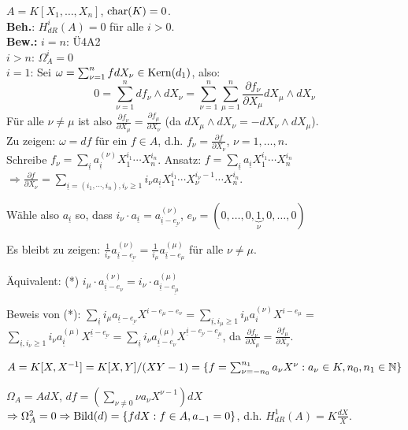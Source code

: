 \documentclass[a4paper, 10pt]{report}
\begin{document}
\begin{nnBsp}
$A=K[X_1, \ldots, X_n]$, $\mathrm{char}(K)=0$.\\
\textbf{Beh.}: $H_{dR}^i(A) = 0$ f\"ur alle $i>0$.\\
\textbf{Bew.: } $i=n$: \"U4A2\\
$i>n$: $\Omega_A^i=0$\\
$i=1$: Sei $\omega=\sum_{\nu=1}^nf dX_\nu\in \mathrm{Kern}(d_1)$, also:
\[
0=\sum_{\nu=1}^n df_\nu \wedge dX_\nu=\sum_{\nu=1}^n \sum_{\mu=1}^n
\frac{\partial f_\nu}{\partial X_\mu}dX_\mu\wedge dX_\nu
\]
F\"ur alle $\nu\neq \mu$ ist also $\frac{\partial f_\nu}{\partial X_\mu}=\frac{\partial f_\mu}{\partial X_\nu}$
(da $dX_\mu\wedge dX_\nu = -dX_\nu\wedge dX_\mu$).\\
Zu zeigen: $\omega = df$ f\"ur ein $f\in A$, d.h. $f_\nu=\frac{\partial f}{\partial X_\nu}$, $\nu=1, \ldots, n$.\\
Schreibe $f_\nu=\sum_{\underline{i}} a_{\underline{i}}^{(\nu)}X_1^{i_1}\cdots X_n^{i_n}$.
Ansatz: $f=\sum_{\underline{i}} a_{\underline{i}} X_1^{i_1}\cdots X_n^{i_n}$
$\Rightarrow \frac{\partial f}{\partial X_\nu}
=\sum_{\underline{i}=(i_1, \cdots, i_n), i_\nu\geq 1}i_\nu a_{\underline{i}}
X_1^{i_1}\cdots X_\nu^{i_\nu-1} \cdots X_n^{i_n}$.

W\"ahle also $a_{\underline{i}}$ so, dass $i_\nu\cdot a_{\underline{i}} = a_{\underline{i}-\underline{e_\nu}}^{(\nu)}$,
$e_\nu=(0,\ldots,0,\underbrace{1}_{\nu},0,\ldots, 0)$

Es bleibt zu zeigen: $\frac{1}{i_\nu} a_{\underline{i}-\underline{e_\nu}}^{(\nu)}
=\frac{1}{i_\mu} a_{\underline{i}-e_\mu}^{(\mu)}$ f\"ur alle $\nu\neq \mu$.

\"Aquivalent: (*) $i_\mu\cdot a_{\underline{i}-e_{\nu}}^{(\nu)}=i_\nu \cdot a_{\underline{i}-\underline{e_\mu}}^{(\mu)}$

Beweis von (*): $
\sum_{\underline{i}} i_\mu a_{\underline{i}-\underline{e_\nu}}X^{i-e_\mu-e_\nu}
= \sum_{\underline{i}, i_\mu\geq 1} i_\mu a_{i}^{(\nu)} X^{i-e_\mu}=$\\
$\sum_{\underline{i}, i_\nu\geq 1}i_\nu a_{\underline{i}}^{(\mu)}X^{\underline{i}-\underline{e_\nu}}
= \sum_{\underline{i}} i_\nu a_{\underline{i}-e_\nu}^{(\mu)}X^{\underline{i}-\underline{e_\nu}-\underline{e_\mu}}$,
da $\frac{\partial f_\nu}{\partial X_\mu} = \frac{\partial f_\mu}{\partial X_\nu}$.
\end{nnBsp}

\begin{nnBsp}
$A=K[X, X^{-1}]=K[X,Y]/(XY-1)=\{f=\sum_{\nu=-n_0}^{n_1} a_\nu X^\nu: a_\nu\in K, n_0, n_1\in \mathbb{N}\}$

$\Omega_A=AdX$, $df=(\sum_{\nu\neq 0}\nu a_\nu X^{\nu-1})dX$
$\Rightarrow \Omega_A^2 = 0 \Rightarrow \mathrm{Bild}(d)=\{fdX:f\in A, a_{-1}=0\}$,
d.h. $H_{dR}^{1}(A) = K\frac{dX}{X}$.
\end{nnBsp}
\end{document}
